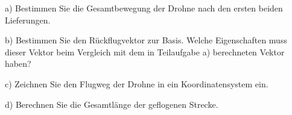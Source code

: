 \documentclass[11pt, a4paper, oneside]{article}
\begin{document}
	a) Bestimmen Sie die Gesamtbewegung der Drohne nach den ersten beiden Lieferungen.
	
	\checkered[6cm]
	
	b) Bestimmen Sie den Rückflugvektor zur Basis. Welche Eigenschaften muss dieser Vektor beim Vergleich mit dem in Teilaufgabe a) berechneten Vektor haben?
	
	\checkered[6cm]
	
	c) Zeichnen Sie den Flugweg der Drohne in ein Koordinatensystem ein.
	
	\checkered[10cm]
	
	d) Berechnen Sie die Gesamtlänge der geflogenen Strecke.
	
	\checkered[6cm]
\end{document}
